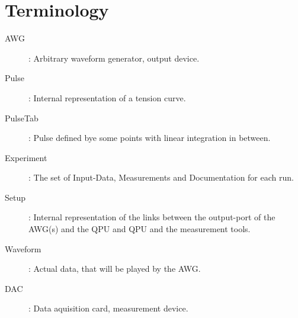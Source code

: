 \documentclass[a4paper,12pt]{article}
\begin{document}
\section{Terminology}
 \begin{description}
  \item[AWG]: Arbitrary waveform generator, output device.
  \item[Pulse]: Internal representation of a tension curve.
  \item[PulseTab]: Pulse defined bye some points with linear integration in between.
  \item[Experiment]: The set of Input-Data, Measurements and Documentation for each run.
  \item[Setup]: Internal representation of the links between the output-port of the AWG(s) and the QPU and QPU and the measurement tools.
  \item[Waveform]: Actual data, that will be played by the AWG. 
  \item[DAC]: Data aquisition card, measurement device.
 \end{description}
\end{document}
